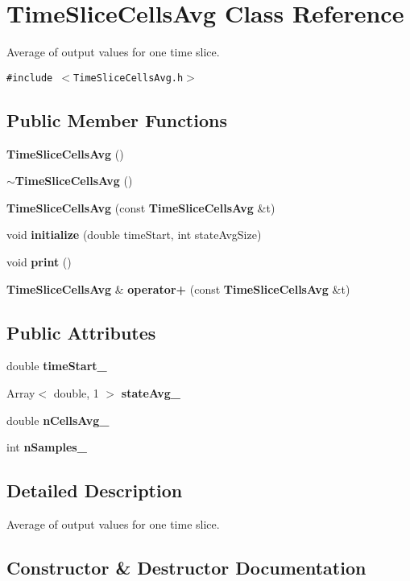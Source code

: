 \section{TimeSliceCellsAvg Class Reference}
\label{classTimeSliceCellsAvg}
Average of output values for one time slice.  


{\tt \#include $<$TimeSliceCellsAvg.h$>$}

\subsection*{Public Member Functions}
\begin{CompactItemize}
\item 
{\bf TimeSliceCellsAvg} ()
\item 
{\bf $\sim$TimeSliceCellsAvg} ()
\item 
{\bf TimeSliceCellsAvg} (const {\bf TimeSliceCellsAvg} \&t)
\item 
void {\bf initialize} (double timeStart, int stateAvgSize)
\item 
void {\bf print} ()
\item 
{\bf TimeSliceCellsAvg} \& {\bf operator+} (const {\bf TimeSliceCellsAvg} \&t)
\end{CompactItemize}
\subsection*{Public Attributes}
\begin{CompactItemize}
\item 
double {\bf timeStart\_\-}
\item 
Array$<$ double, 1 $>$ {\bf stateAvg\_\-}
\item 
double {\bf nCellsAvg\_\-}
\item 
int {\bf nSamples\_\-}
\end{CompactItemize}


\subsection{Detailed Description}
Average of output values for one time slice. 

\subsection{Constructor \& Destructor Documentation}
